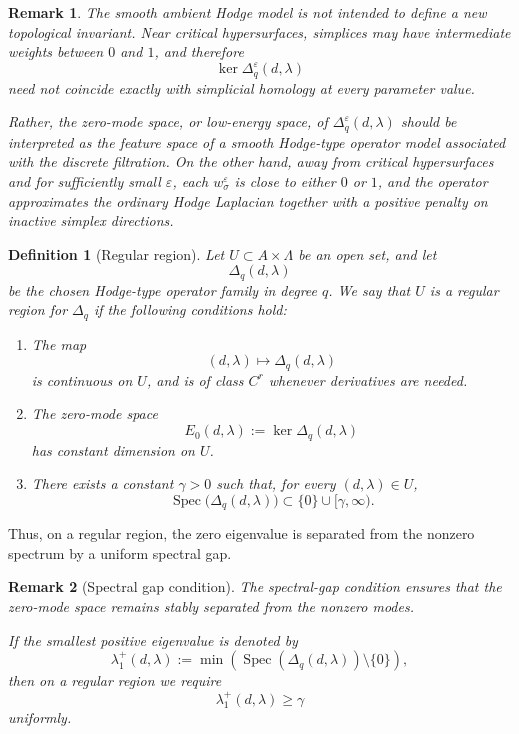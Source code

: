 \documentclass[10pt,a4paper]{amsart}
\newtheorem{remark}{Remark}%
\newtheorem{definition}{Definition}%
\begin{document}
\begin{remark}
The smooth ambient Hodge model is not intended to define a new topological
invariant. Near critical hypersurfaces, simplices may have intermediate weights
between \(0\) and \(1\), and therefore
\[
\ker \Delta_q^\varepsilon(d,\lambda)
\]
need not coincide exactly with simplicial homology at every parameter value.

Rather, the zero-mode space, or low-energy space, of
\(\Delta_q^\varepsilon(d,\lambda)\) should be interpreted as the feature space of
a smooth Hodge-type operator model associated with the discrete filtration. On
the other hand, away from critical hypersurfaces and for sufficiently small
\(\varepsilon\), each \(w_\sigma^\varepsilon\) is close to either \(0\) or \(1\),
and the operator approximates the ordinary Hodge Laplacian together with a
positive penalty on inactive simplex directions.
\end{remark}

\begin{definition}[Regular region]
Let \(U\subset A\times\Lambda\) be an open set, and let
\[
\Delta_q(d,\lambda)
\]
be the chosen Hodge-type operator family in degree \(q\). We say that \(U\) is a
\emph{regular region} for \(\Delta_q\) if the following conditions hold:

\begin{enumerate}
    \item The map
    \[
    (d,\lambda)\longmapsto \Delta_q(d,\lambda)
    \]
    is continuous on \(U\), and is of class \(C^r\) whenever derivatives are
    needed.

    \item The zero-mode space
    \[
    E_0(d,\lambda):=\ker \Delta_q(d,\lambda)
    \]
    has constant dimension on \(U\).

    \item There exists a constant \(\gamma>0\) such that, for every
    \((d,\lambda)\in U\),
    \[
    \operatorname{Spec}\bigl(\Delta_q(d,\lambda)\bigr)
    \subset
    \{0\}\cup[\gamma,\infty).
    \]
\end{enumerate}
\end{definition}

Thus, on a regular region, the zero eigenvalue is separated from the nonzero
spectrum by a uniform spectral gap.

\begin{remark}[Spectral gap condition]
The spectral-gap condition ensures that the zero-mode space remains stably
separated from the nonzero modes.

If the smallest positive eigenvalue is denoted by
\[
\lambda_1^+(d,\lambda)
:=
\min\left(
\operatorname{Spec}(\Delta_q(d,\lambda))
\setminus\{0\}
\right),
\]
then on a regular region we require
\[
\lambda_1^+(d,\lambda)\ge \gamma
\]
uniformly.
\end{remark}
\end{document}

